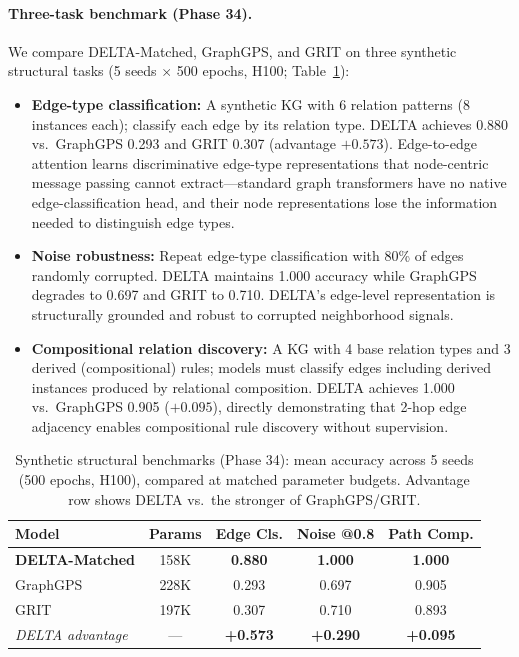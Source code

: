 \documentclass{article}
\begin{document}
\paragraph{Three-task benchmark (Phase 34).}
We compare DELTA-Matched, GraphGPS, and GRIT on three synthetic structural tasks (5 seeds $\times$ 500 epochs, H100; Table~\ref{tab:synthetic}):
\begin{itemize}
    \item \textbf{Edge-type classification:} A synthetic KG with 6 relation patterns (8 instances each); classify each edge by its relation type. DELTA achieves 0.880 vs.\ GraphGPS 0.293 and GRIT 0.307 (advantage $+0.573$). Edge-to-edge attention learns discriminative edge-type representations that node-centric message passing cannot extract---standard graph transformers have no native edge-classification head, and their node representations lose the information needed to distinguish edge types.
    \item \textbf{Noise robustness:} Repeat edge-type classification with 80\% of edges randomly corrupted. DELTA maintains 1.000 accuracy while GraphGPS degrades to 0.697 and GRIT to 0.710. DELTA's edge-level representation is structurally grounded and robust to corrupted neighborhood signals.
    \item \textbf{Compositional relation discovery:} A KG with 4 base relation types and 3 derived (compositional) rules; models must classify edges including derived instances produced by relational composition. DELTA achieves 1.000 vs.\ GraphGPS 0.905 ($+0.095$), directly demonstrating that 2-hop edge adjacency enables compositional rule discovery without supervision.
\end{itemize}

\begin{table}[t]
\centering
\caption{Synthetic structural benchmarks (Phase 34): mean accuracy across 5 seeds (500 epochs, H100), compared at matched parameter budgets. Advantage row shows DELTA vs.\ the stronger of GraphGPS/GRIT.}
\label{tab:synthetic}
\begin{tabular}{@{}lcccc@{}}
\toprule
\textbf{Model} & \textbf{Params} & \textbf{Edge Cls.} & \textbf{Noise @0.8} & \textbf{Path Comp.} \\
\midrule
\textbf{DELTA-Matched} & 158K & \textbf{0.880} & \textbf{1.000} & \textbf{1.000} \\
GraphGPS & 228K & 0.293 & 0.697 & 0.905 \\
GRIT & 197K & 0.307 & 0.710 & 0.893 \\
\midrule
\textit{DELTA advantage} & --- & \textbf{+0.573} & \textbf{+0.290} & \textbf{+0.095} \\
\bottomrule
\end{tabular}
\end{table}
\end{document}
